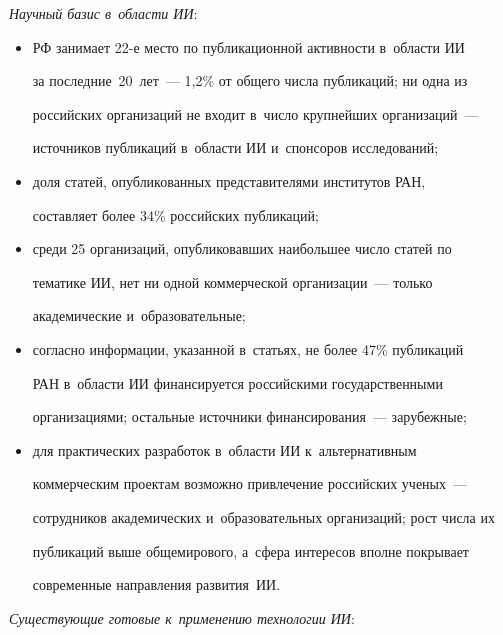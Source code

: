   

  \textit{Научный базис в~области ИИ}:

\begin{itemize}

\item РФ занимает 22-е место по публикационной активности в~области ИИ 

за последние~20~лет~--- 1,2\% от общего числа публикаций; ни одна из 

российских организаций не входит в~число крупнейших организаций~--- 

источников публикаций в~области ИИ и~спонсоров исследований;

\item доля статей, опубликованных представителями институтов РАН, 

составляет более 34\% российских публикаций;

\item среди 25 организаций, опубликовавших наибольшее число статей по 

тематике ИИ, нет ни одной коммерческой организации~--- только 

академические и~образовательные;

\item согласно информации, указанной в~статьях, не более 47\% публикаций 

РАН в~области ИИ финансируется российскими государственными 

организациями; остальные источники финансирования~--- зарубежные;

\item для практических разработок в~области ИИ к~альтернативным 

коммерческим проектам возможно привлечение российских ученых~--- 

сотрудников академических и~образовательных организаций; рост числа их 

публикаций выше общемирового, а~сфера интересов вполне покрывает 

современные направления развития~ИИ.

  \end{itemize}

  

  \textit{Существующие готовые к~применению технологии ИИ}:


